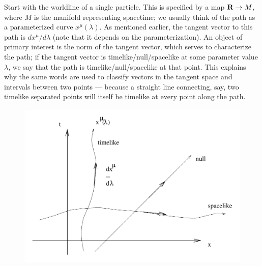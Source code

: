 \documentclass[12pt]{article}
\begin{document}
Start with the worldline of a single particle.  This is specified
by a map ${\bf R} \rightarrow M$, where $M$ is the manifold representing
spacetime; we usually think of the path as a parameterized curve
$x^\mu(\lambda)$.  As mentioned earlier, the tangent vector to this
path is $dx^\mu/d\lambda$ (note that it depends on the parameterization).  
An object of primary interest is the norm
of the tangent vector, which serves to characterize the path; if the
tangent vector is timelike/null/spacelike at some parameter value
$\lambda$, we say that the path is timelike/null/spacelike at that
point.  This explains why the same words are used to classify vectors
in the tangent space and intervals between two points --- because a
straight line connecting, say, two timelike separated points will 
itself be timelike at every point along the path.

\begin{figure}
  \centerline{
  \includegraphics[height=8cm]{pdf/one5}}
\end{figure}
\end{document}
